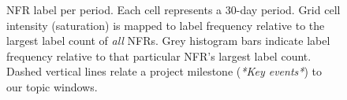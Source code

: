 \documentclass[smallextended]{svjour3}       %
\begin{document}
\begin{figure}[t]
\centering
{}	    
					     

	\caption[]{NFR label per period. Each cell represents a 30-day period. %
	Grid cell intensity (saturation) is mapped to label frequency
	relative to the largest label count of \emph{all} NFRs. Grey
	histogram bars indicate label frequency relative to that
	particular NFR's largest label count. Dashed vertical lines
	relate a project milestone (\emph{*Key events*}) to our topic windows. 
}
\label{fig:timelines}
\end{figure}
\end{document}
